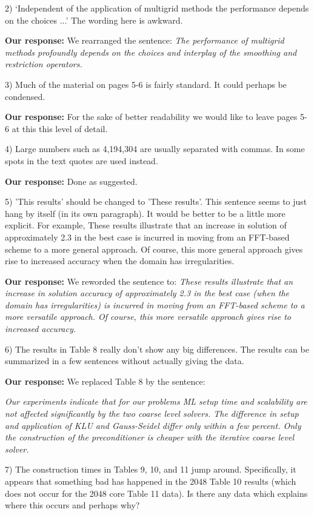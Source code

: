 \documentclass[10pt,pdftex]{report}
\begin{document}
2) `Independent of the application of multigrid methods the performance depends
on the choices ...' The wording here is awkward.

{\textbf{Our response:}} We rearranged the sentence: {\it The performance of
multigrid methods profoundly depends on the choices and interplay of the
smoothing and restriction operators.}


3) Much of the material on pages 5-6 is fairly standard. It could perhaps be
condensed.

{\textbf{Our response:}} For the sake of better readability we would
like to leave pages 5-6 at this this level of detail.

4) Large numbers such as 4,194,304 are usually separated with commas. In some
spots in the text quotes are used instead.

{\textbf{Our response:}}  Done as suggested.

5) 'This results' should be changed to 'These results'. This sentence seems to
just hang by itself (in its own paragraph). It would be better to be a little
more explicit. For example, These results illustrate that an increase in
solution of approximately 2.3 in the best case is incurred in moving from an
FFT-based scheme to a more general approach. Of course, this more general
approach gives rise to increased accuracy when the domain has irregularities.

{\textbf{Our response:}}  We reworded the sentence to: {\it These results
illustrate that an increase in solution accuracy of approximately 2.3 in the
best case (when the domain has irregularities) is incurred in moving from an
FFT-based scheme to a more versatile approach.  Of course, this more
versatile approach gives rise to increased accuracy.}

6) The results in Table 8 really don't show any big differences. The results can
be summarized in a few sentences without actually giving the data.

{\textbf{Our response:}} We replaced Table 8 by the sentence:

\textit{
Our experiments indicate that for our problems ML setup time and scalability are
not affected significantly by the two coarse level solvers. The difference in
setup and application of KLU and Gauss-Seidel differ only within a few
percent. Only the construction of the preconditioner is cheaper with the
iterative coarse level solver.  
}

7) The construction times in Tables 9, 10, and 11 jump around. Specifically, it
appears that something bad has happened in the 2048 Table 10 results (which does
not occur for the 2048 core Table 11 data). Is there any data which explains
where this occurs and perhaps why?
\end{document}
